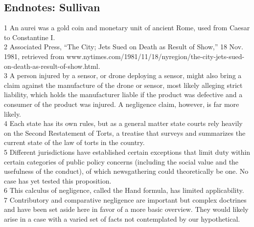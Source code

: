 \begin{itemize}
\begin{itemized}
\begin{itemize}
\section{Endnotes: Sullivan}
1 An aurei was a gold coin and monetary unit of ancient Rome, used from Caesar to Constantine I.\\
2 Associated Press, ``The City; Jets Sued on Death as Result of Show,'' 18 Nov. 1981, retrieved from
www.nytimes.com/1981/11/18/nyregion/the-city-jets-sued-on-death-as-result-of-show.html.\\
3 A person injured by a sensor, or drone deploying a sensor, might also bring a claim against
the manufacture of the drone or sensor, most likely alleging strict liability, which holds the
manufacturer liable if the product was defective and a consumer of the product was injured.
A negligence claim, however, is far more likely.\\
4 Each state has its own rules, but as a general matter state courts rely heavily on the Second
Restatement of Torts, a treatise that surveys and summarizes the current state of the law of
torts in the country.\\
5 Different jurisdictions have established certain exceptions that limit duty within certain categories
of public policy concerns (including the social value and the usefulness of the conduct), of which
newsgathering could theoretically be one. No case has yet tested this proposition.\\
6 This calculus of negligence, called the Hand formula, has limited applicability.\\
7 Contributory and comparative negligence are important but complex doctrines and have been set
aside here in favor of a more basic overview. They would likely arise in a case with a varied set of
facts not contemplated by our hypothetical.\\


\end{itemize}
\end{itemized}
\end{itemize}
